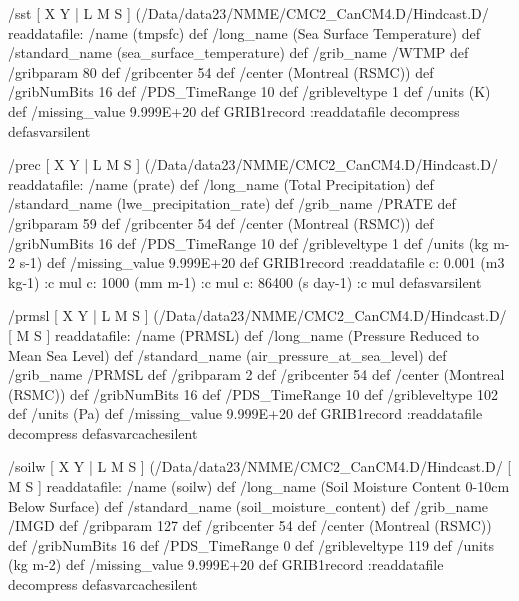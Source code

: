 \begin{ingrid}
/sst {
[ X Y | L M S ] (/Data/data23/NMME/CMC2_CanCM4.D/Hindcast.D/%
readdatafile: 
/name (tmpsfc) def
/long_name (Sea Surface Temperature) def
/standard_name (sea_surface_temperature) def
/grib_name /WTMP def
/gribparam 80 def
/gribcenter 54 def
/center (Montreal (RSMC)) def
/gribNumBits 16 def
/PDS_TimeRange 10 def
/gribleveltype 1 def
/units (K) def
/missing_value 9.999E+20 def
GRIB1record
:readdatafile decompress
} defasvarsilent

/prec {
[ X Y | L M S ] (/Data/data23/NMME/CMC2_CanCM4.D/Hindcast.D/%
readdatafile: 
/name (prate) def
/long_name (Total Precipitation) def
/standard_name (lwe_precipitation_rate) def
/grib_name /PRATE def
/gribparam 59 def
/gribcenter 54 def
/center (Montreal (RSMC)) def
/gribNumBits 16 def
/PDS_TimeRange 10 def
/gribleveltype 1 def
/units (kg m-2 s-1) def
/missing_value 9.999E+20 def
GRIB1record 
:readdatafile
  c:
   0.001 (m3 kg-1) :c
   mul
  c:
   1000 (mm m-1) :c
   mul
  c:
   86400 (s day-1) :c
   mul
} defasvarsilent

/prmsl {
[ X Y | L M S ]
(/Data/data23/NMME/CMC2_CanCM4.D/Hindcast.D/%
[ M S ]
readdatafile: 
/name (PRMSL) def
/long_name (Pressure Reduced to Mean Sea Level) def
/standard_name (air_pressure_at_sea_level) def
/grib_name /PRMSL def
/gribparam 2 def
/gribcenter 54 def
/center (Montreal (RSMC)) def
/gribNumBits 16 def
/PDS_TimeRange 10 def
/gribleveltype 102 def
/units (Pa) def
/missing_value 9.999E+20 def
GRIB1record
:readdatafile decompress
} defasvarcachesilent

/soilw {
[ X Y | L M S ]
(/Data/data23/NMME/CMC2_CanCM4.D/Hindcast.D/%
[ M S ]
readdatafile: 
/name (soilw) def
/long_name (Soil Moisture Content 0-10cm Below Surface) def
/standard_name (soil_moisture_content) def
/grib_name /IMGD def
/gribparam 127 def
/gribcenter 54 def
/center (Montreal (RSMC)) def
/gribNumBits 16 def
/PDS_TimeRange 0 def
/gribleveltype 119 def
/units (kg m-2) def
/missing_value 9.999E+20 def
GRIB1record
:readdatafile decompress
} defasvarcachesilent


\end{ingrid}
